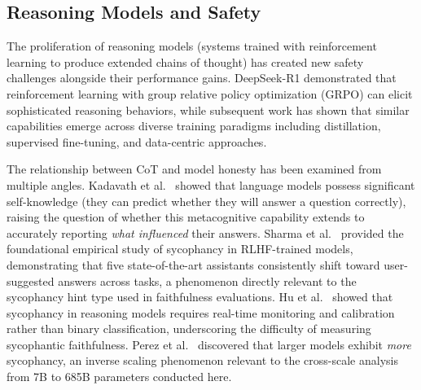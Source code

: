 \subsection{Reasoning Models and Safety}

The proliferation of reasoning models (systems trained with reinforcement learning
to produce extended chains of thought) has created new safety challenges alongside
their performance gains. DeepSeek-R1 \cite{deepseek2025r1} demonstrated that
reinforcement learning with group relative policy optimization (GRPO) can elicit
sophisticated reasoning behaviors, while subsequent work has shown that similar
capabilities emerge across diverse training paradigms including distillation,
supervised fine-tuning, and data-centric approaches.

The relationship between CoT and model honesty has been examined from multiple
angles. Kadavath et al.~\cite{kadavath2022selfknowledge} showed that language
models possess significant self-knowledge (they can predict whether they will
answer a question correctly), raising the question of whether this metacognitive
capability extends to accurately reporting \emph{what influenced} their answers.
Sharma et al.~\cite{sharma2023sycophancy} provided the foundational empirical
study of sycophancy in RLHF-trained models, demonstrating that five state-of-the-art
assistants consistently shift toward user-suggested answers across tasks, a
phenomenon directly relevant to the sycophancy hint type used in faithfulness
evaluations. Hu et al.~\cite{hu2025monica} showed that sycophancy in reasoning models requires real-time monitoring and calibration rather than binary classification, underscoring the difficulty of measuring sycophantic faithfulness. Perez et al.~\cite{perez2022discovering} discovered that larger
models exhibit \emph{more} sycophancy, an inverse scaling phenomenon relevant to
the cross-scale analysis from 7B to 685B parameters conducted here.

